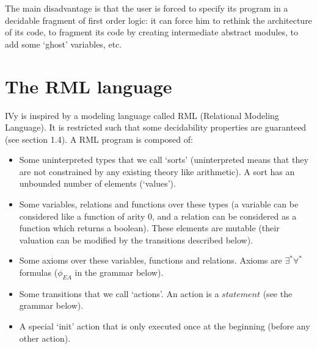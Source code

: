 \documentclass[11pt,a4paper,oldfontcommands]{memoir}
\begin{document}
    The main disadvantage is that the user is forced to specify its program in a decidable fragment of first order logic:
    it can force him to rethink the architecture of its code, to fragment its code by creating intermediate abstract modules,
    to add some `ghost' variables, etc.

    \section{The RML language}

    IVy is inspired by a modeling language called RML (Relational Modeling Language). It is restricted such that some decidability properties are guaranteed (see section 1.4).
    A RML program is composed of:
    \begin{itemize}
        \item Some uninterpreted types that we call `sorts' (uninterpreted means that they are not constrained by any existing theory like arithmetic). A sort has an unbounded number of elements (`values').
        \item Some variables, relations and functions over these types (a variable can be considered like a function of arity 0, and a relation can be considered as a function
        which returns a boolean). These elements are mutable (their valuation can be modified by the transitions described below).
        \item Some axioms over these variables, functions and relations. Axioms are \(\exists^*\forall^*\) formulas (\( \phi_{EA} \) in the grammar below).
        \item Some transitions that we call `actions'. An action is a \(statement\) (see the grammar below).
        \item A special `init' action that is only executed once at the beginning (before any other action).
    \end{itemize}
\end{document}
